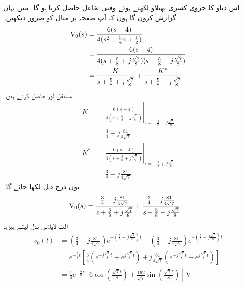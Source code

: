 اس دباو کا جزوی کسری پھیلاو لکھتے ہوئے وقتی تفاعل حاصل کرنا ہو گا۔ میں یہاں گزارش کروں گا ہوں کہ آپ صفحہ  پر مثال  کو ضرور دیکھیں۔
\begin{align*}
{\ensuremath{{\textup{V}}}}_0(s)&=\frac{6(s+4)}{4(s^2+\frac{5}{4}s+\frac{1}{2})}\\
&=\frac{6(s+4)}{4(s+\frac{5}{8}+j\frac{\sqrt{7}}{8})(s+\frac{5}{8}-j\frac{\sqrt{7}}{8})}\\
&=\frac{K}{s+\frac{5}{8}+j\frac{\sqrt{7}}{8}}+\frac{K^*}{s+\frac{5}{8}-j\frac{\sqrt{7}}{8}}
\end{align*}
مستقل  اور  حاصل کرتے ہیں۔
\begin{align*}
K&=\left. \frac{6(s+4)}{4(s+\frac{5}{8}-j\frac{\sqrt{7}}{8})} \right|_{s=-\frac{5}{8}-j\frac{\sqrt{7}}{8}}\\
&=\frac{3}{4}+j\frac{81}{4\sqrt{7}}\\
K^*&=\left. \frac{6(s+4)}{4(s+\frac{5}{8}+j\frac{\sqrt{7}}{8})} \right|_{s=-\frac{5}{8}+j\frac{\sqrt{7}}{8}}\\
&=\frac{3}{4}-j\frac{81}{4\sqrt{7}}
\end{align*}
یوں درج ذیل لکھا جائے گا۔
\begin{align*}
{\ensuremath{{\textup{V}}}}_0(s)&=\frac{\frac{3}{4}+j\frac{81}{4\sqrt{7}}}{s+\frac{5}{8}+j\frac{\sqrt{7}}{8}}+\frac{\frac{3}{4}-j\frac{81}{4\sqrt{7}}}{s+\frac{5}{8}-j\frac{\sqrt{7}}{8}}
\end{align*}
الٹ لاپلاس بدل لیتے ہیں۔
\begin{align*}
v_0(t)&=\left(\frac{3}{4}+j\frac{81}{4\sqrt{7}}\right)e^{-(\frac{5}{8}+j\frac{\sqrt{7}}{8})t}+\left(\frac{3}{4}-j\frac{81}{4\sqrt{7}}\right)e^{-(\frac{5}{8}-j\frac{\sqrt{7}}{8})t}\\
&=e^{-\frac{5}{8}t}\left[\frac{3}{4}\left(e^{-j\frac{\sqrt{7}}{8}t}+e^{j\frac{\sqrt{7}}{8}t}\right)+j\frac{81}{4\sqrt{7}}\left(e^{-j\frac{\sqrt{7}}{8}t}-e^{j\frac{\sqrt{7}}{8}t}\right)\right]\\
&=\frac{1}{4} e^{-\frac{5}{8}t}\left[6\cos\left(\frac{\sqrt{7} t}{8}\right)+\frac{162}{\sqrt{7}} \sin \left(\frac{\sqrt{7}t}{8}\right)\right] \,\si{\volt}
\end{align*}

